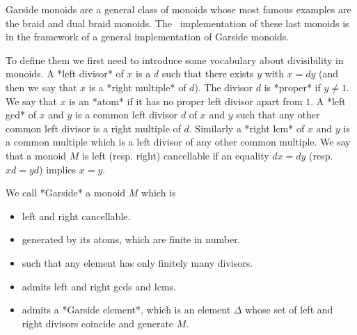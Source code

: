 \def\bb{{\bf b}}
\def\bs{{\bf s}}
\def\bt{{\bf t}}
\def\bw{{\bf w}}
\def\bS{{\bf S}}
\def\bW{{\bf W}}


Garside  monoids are a general class  of monoids whose most famous examples
are  the braid and dual braid monoids. The \CHEVIE\ implementation of these
last  monoids is  in the  framework of  a general implementation of Garside
monoids.

To   define  them  we  first  need   to  introduce  some  vocabulary  about
divisibility  in monoids. A *left divisor* of  $x$ is a $d$ such that there
exists  $y$ with $x=dy$ (and then we say  that $x$ is a *right multiple* of
$d$). The divisor $d$ is *proper* if $y\ne 1$. We say that $x$ is an *atom*
if  it has no proper left  divisor apart from $1$. A  *left gcd* of $x$ and
$y$  is a common left divisor $d$ of $x$ and $y$ such that any other common
left divisor is a right multiple of $d$. Similarly a *right lcm* of $x$ and
$y$  is  a  common  multiple  which  is  a left divisor of any other common
multiple.  We say that a monoid $M$ is left (resp. right) cancellable if an
equality $dx=dy$ (resp. $xd=yd$) implies $x=y$.

We  call *Garside* a monoid $M$ which is\:
\begin{itemize}
\item left and right cancellable.
\item generated by its atoms,  which are finite in number.
\item such that any element has only finitely many divisors.
\item admits left and  right  gcds  and  lcms.
\item admits a *Garside element*, which is an element $\Delta$ whose set of
left and right divisors coincide and generate $M$.
\end{itemize}

